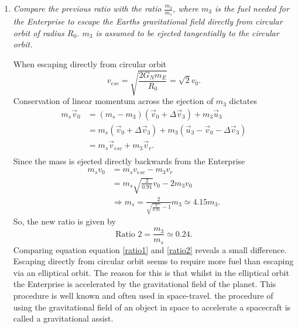 \begin{example}
\begin{enumerate}
		\item \emph{Compare the previous ratio with the ratio $\frac{m_3}{m_s}$, where $m_3$ is the fuel needed for the Enterprise to escape the Earths gravitational field directly from circular orbit of radius $R_0$. $m_3$ is assumed to be ejected tangentially to the circular orbit.}
		
		When escaping directly from circular orbit
		\begin{equation}
			v_{esc}=\sqrt{\frac{2G_Nm_E}{R_0}}=\sqrt{2}v_0.
		\end{equation} 
		Conservation of linear momentum across the ejection of $m_3$ dictates
		\begin{equation}
			\begin{split}
				m_s\vec{v}_0&=(m_s-m_3)(\vec{v}_0+\Delta \vec{v}_3)+m_3\vec{u}_3\\
				&=m_s(\vec{v}_0+\Delta \vec{v}_3)+m_3(\vec{u}_3-\vec{v}_0-\Delta \vec{v}_3)\\
				&=m_s\vec{v}_{esc}+m_3\vec{v}_r.\\
			\end{split}
		\end{equation} 
		Since the mass is ejected directly backwards from the Enterprise
		\begin{equation}
			\begin{split}
				m_sv_0&=m_sv_{esc}-m_3v_r\\
				&=m_s\sqrt{\frac{2}{0.91}}v_0-2m_3v_0\\
				&\Rightarrow m_s=\frac{2}{\sqrt{\frac{2}{0.91}}-1}m_3\simeq 4.15 m_3.
			\end{split}
		\end{equation} 
		So, the new ratio is given by
		\begin{equation}
			\text{Ratio 2}=\frac{m_3}{m_s}\simeq 0.24.
			\label{ratio2}
		\end{equation} 
		Comparing equation equation \eqref{ratio1} and \eqref{ratio2} reveals a small difference. Escaping directly from circular orbit seems to require more fuel than escaping via an elliptical orbit. The reason for this is that whilst in the elliptical orbit the Enterprise is accelerated by the gravitational field of the planet. This procedure is well known and often used in space-travel. the procedure of using the gravitational field of an object in space to accelerate a spacecraft is called a gravitational assist.
	\end{enumerate}
\end{example}

